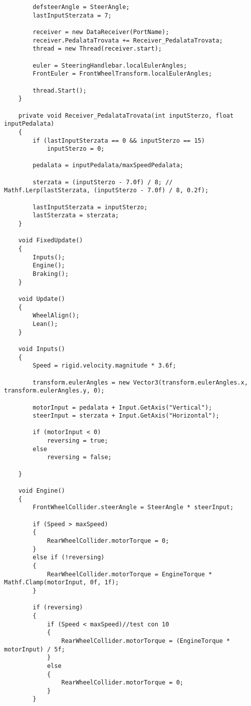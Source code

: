 \begin{lstlisting}
        defsteerAngle = SteerAngle;
        lastInputSterzata = 7;

        receiver = new DataReceiver(PortName);
        receiver.PedalataTrovata += Receiver_PedalataTrovata;
        thread = new Thread(receiver.start);

        euler = SteeringHandlebar.localEulerAngles;
        FrontEuler = FrontWheelTransform.localEulerAngles;

        thread.Start();
    }
 
    private void Receiver_PedalataTrovata(int inputSterzo, float inputPedalata)
    {
        if (lastInputSterzata == 0 && inputSterzo == 15)
            inputSterzo = 0;
            
        pedalata = inputPedalata/maxSpeedPedalata;

        sterzata = (inputSterzo - 7.0f) / 8; // Mathf.Lerp(lastSterzata, (inputSterzo - 7.0f) / 8, 0.2f);

        lastInputSterzata = inputSterzo;
        lastSterzata = sterzata;
    }

    void FixedUpdate()
    {
        Inputs();
        Engine();
        Braking();
    }

    void Update()
    {
        WheelAlign();
        Lean();
    }

    void Inputs()
    {
        Speed = rigid.velocity.magnitude * 3.6f;

        transform.eulerAngles = new Vector3(transform.eulerAngles.x, transform.eulerAngles.y, 0);

        motorInput = pedalata + Input.GetAxis("Vertical");
        steerInput = sterzata + Input.GetAxis("Horizontal");

        if (motorInput < 0)
            reversing = true;
        else
            reversing = false;

    }

    void Engine()
    {
        FrontWheelCollider.steerAngle = SteerAngle * steerInput;

        if (Speed > maxSpeed)
        {
            RearWheelCollider.motorTorque = 0;
        }
        else if (!reversing)
        {
            RearWheelCollider.motorTorque = EngineTorque * Mathf.Clamp(motorInput, 0f, 1f);
        }

        if (reversing)
        {
            if (Speed < maxSpeed)//test con 10
            {
                RearWheelCollider.motorTorque = (EngineTorque * motorInput) / 5f;
            }
            else
            {
                RearWheelCollider.motorTorque = 0;
            }
        }


\end{lstlisting}
